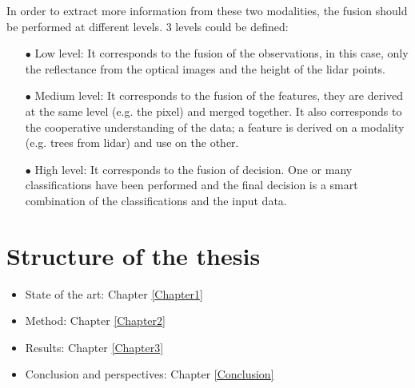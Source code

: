 In order to extract more information from these two modalities, the fusion should be performed at different levels. 3 levels could be defined:
\begin{itemize}
\item[$\bullet$] Low level: It corresponds to the fusion of the observations, in this case, only the reflectance from the optical images and the height of the lidar points.
\item[$\bullet$] Medium level: It corresponds to the fusion of the features, they are derived at the same level (e.g. the pixel) and merged together. It also corresponds to the cooperative understanding of the data; a feature is derived on a modality (e.g. trees from lidar) and use on the other.
\item[$\bullet$] High level: It corresponds to the fusion of decision. One or many classifications have been performed and the final decision is a smart combination of the classifications and the input data.
\end{itemize}

\section{Structure of the thesis}

\begin{itemize}
\item State of the art: Chapter \ref{Chapter1}
\item Method: Chapter \ref{Chapter2}
\item Results: Chapter \ref{Chapter3}
\item Conclusion and perspectives: Chapter \ref{Conclusion}
\end{itemize}

\stopcontents[chapters]